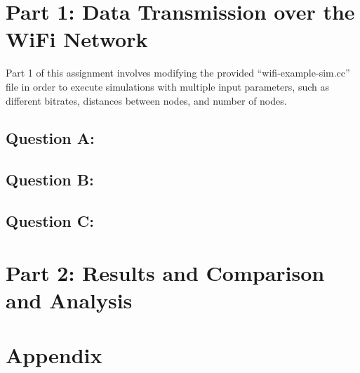 \documentclass[a4paper]{article}
\begin{document}
\hypersetup{pageanchor=false}

\hypersetup{pageanchor=true}

\tableofcontents
\clearpage
\section{Part 1: Data Transmission over the WiFi Network}
Part 1 of this assignment involves modifying the provided
``wifi-example-sim.cc'' file in order to execute simulations with multiple input
parameters, such as different bitrates, distances between nodes, and number of
nodes.
\subsection{Question A:}


\subsection{Question B:}

\subsection{Question C:}



\section{Part 2: Results and Comparison and Analysis}

\clearpage
\section{Appendix}

\clearpage
\printbibliography
\end{document}
